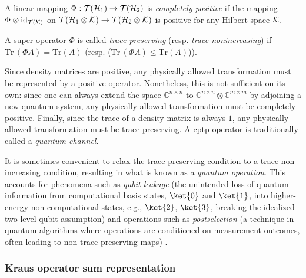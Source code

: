 \begin{definition} \label{def:completely_positive_superoperator}
  A linear mapping $ \Phi : \mathcal{T}(\mathcal{H}_1) \to \mathcal{T}(\mathcal{H}_2)$ is \emph{completely positive} if the mapping 
$\Phi \otimes \mathrm{id}_{\mathcal{T}(\mathcal{K})}$ on $\mathcal{T}(\mathcal{H}_1 \otimes \mathcal{K}) \to \mathcal{T}(\mathcal{H}_2 \otimes \mathcal{K}) $ is positive for any Hilbert space $\mathcal{K}$.
\end{definition}

\begin{definition} \label{def:trace_preserving_superoperator}
  A super-operator $\Phi$ is called \emph{trace-preserving} (resp. \emph{trace-nonincreasing}) if $\text{Tr} \hspace{2pt} (\Phi A)= \text{Tr} (A) $ (resp. ($\text{Tr} \hspace{2pt} (\Phi A)\leq \text{Tr} (A)$)).
\end{definition}

Since density matrices are positive, any physically allowed transformation must be represented by a positive operator. Nonetheless, this is not sufficient on its own: since one can always extend the space $\mathbb{C}^{n \times n}$ to  $\mathbb{C}^{n \times n} \otimes \mathbb{C}^{m \times m} $ by adjoining a new quantum system, any physically allowed transformation must be completely positive. Finally, since the trace of a density matrix is always $1$, any physically allowed transformation must be trace-preserving. A \acrfull{cptp} operator is traditionally called a \emph{quantum channel}.


It is sometimes convenient to relax the trace-preserving condition to a trace-non-increasing condition, resulting in what is known as a \emph{quantum operation}. This accounts for phenomena such as \emph{qubit leakage} (the unintended loss of quantum information from computational basis states, $\ket{0}$ and $\ket{1}$, into higher-energy non-computational states, e.g., $\ket{2}$, $\ket{3}$, breaking the idealized two-level qubit assumption) and operations such as \emph{postselection} (a technique in quantum algorithms where operations are conditioned on measurement outcomes, often leading to non-trace-preserving maps) \cite{Yu_trace_non_inc}.









\subsubsection{Kraus operator sum representation}


